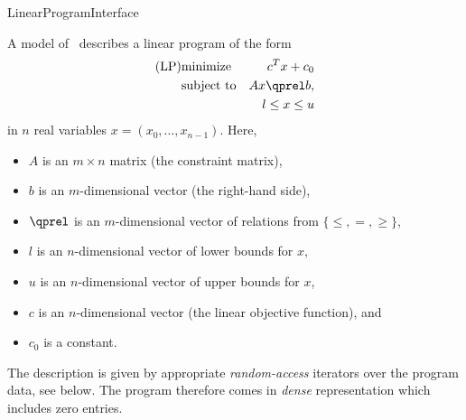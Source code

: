\begin{ccRefConcept}{LinearProgramInterface}

\ccDefinition
A model of \ccRefName\ describes a linear program of the form
\begin{eqnarray*}
\mbox{(LP)}& \mbox{minimize} & c^{T}x+c_0 \\
&\mbox{subject to}   & Ax\qprel b, \\
&                    & l \leq x \leq u
\end{eqnarray*}
in $n$ real variables $x=(x_0,\ldots,x_{n-1})$.
Here, 
\begin{itemize}
\item $A$ is an $m\times n$ matrix (the constraint matrix), 
\item $b$ is an $m$-dimensional vector (the right-hand side),
\item $\qprel$ is an $m$-dimensional vector of relations 
from $\{\leq, =, \geq\}$, 
\item $l$ is an $n$-dimensional vector of lower
bounds for $x$,
\item $u$ is an $n$-dimensional vector of upper bounds for
$x$, 
\item $c$ is an $n$-dimensional vector (the linear objective
  function), and 
\item $c_0$ is a constant.
\end{itemize}

The description is given by appropriate \emph{random-access} 
iterators over the program data, see below. The program therefore 
comes in \emph{dense} representation which includes zero entries.

\ccHasModels
{}\\
\\


\ccTypes





\end{ccRefConcept}

